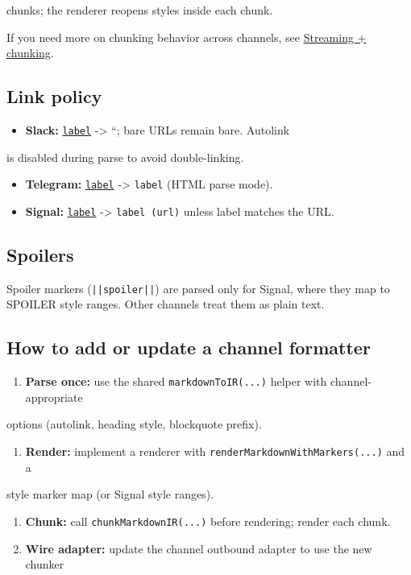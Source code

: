 chunks; the renderer reopens styles inside each chunk.

If you need more on chunking behavior across channels, see
\href{/concepts/streaming}{Streaming + chunking}.

\subsection{Link policy}


\begin{itemize}
  \item \textbf{Slack:} \texttt{\href{url}{label}} -> ``; bare URLs remain bare. Autolink
\end{itemize}

is disabled during parse to avoid double-linking.
\begin{itemize}
  \item \textbf{Telegram:} \texttt{\href{url}{label}} -> \texttt{label} (HTML parse mode).
  \item \textbf{Signal:} \texttt{\href{url}{label}} -> \texttt{label (url)} unless label matches the URL.
\end{itemize}


\subsection{Spoilers}


Spoiler markers (\texttt{||spoiler||}) are parsed only for Signal, where they map to
SPOILER style ranges. Other channels treat them as plain text.

\subsection{How to add or update a channel formatter}


\begin{enumerate}
  \item \textbf{Parse once:} use the shared \texttt{markdownToIR(...)} helper with channel-appropriate
\end{enumerate}

options (autolink, heading style, blockquote prefix).
\begin{enumerate}
  \item \textbf{Render:} implement a renderer with \texttt{renderMarkdownWithMarkers(...)} and a
\end{enumerate}

style marker map (or Signal style ranges).
\begin{enumerate}
  \item \textbf{Chunk:} call \texttt{chunkMarkdownIR(...)} before rendering; render each chunk.
  \item \textbf{Wire adapter:} update the channel outbound adapter to use the new chunker
\end{enumerate}

